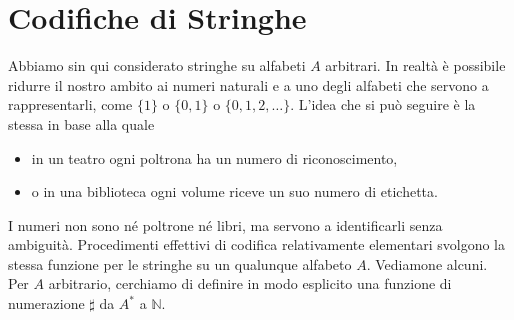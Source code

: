 \section{Codifiche di Stringhe}

Abbiamo sin qui considerato stringhe su alfabeti $A$ arbitrari. In realtà è
possibile ridurre il nostro ambito ai numeri naturali e a uno degli alfabeti che
servono a rappresentarli, come $\{1\}$ o $\{0, 1\}$ o $\{0, 1, 2, \ldots\}$.
L'idea che si può seguire è la stessa in base alla quale

\begin{itemize}
    \item in un teatro ogni poltrona ha un numero di riconoscimento,
    \item o in una biblioteca ogni volume riceve un suo numero di etichetta.
\end{itemize}

I numeri non sono né poltrone né libri, ma servono a identificarli senza ambiguità.
Procedimenti effettivi di codifica relativamente elementari svolgono la stessa
funzione per le stringhe su un qualunque alfabeto $A$. Vediamone alcuni. Per $A$
arbitrario, cerchiamo di definire in modo esplicito una funzione di numerazione $\sharp$
da $A^*$ a $\mathbb{N}$.

